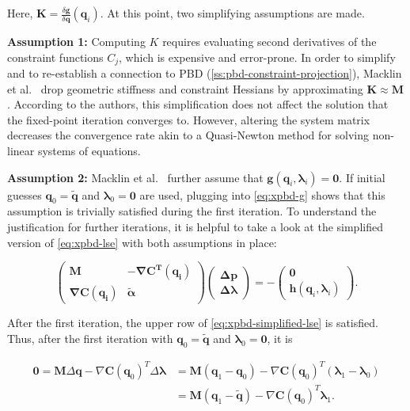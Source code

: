 \noindent Here, $\bm{K} = \frac{\delta \bm{g}}{\delta \bm{q}}(\bm{q}_i)$. At this point, two simplifying assumptions are made.

\textbf{Assumption 1:} Computing $K$ requires evaluating second derivatives of the constraint functions
$C_j$, which is expensive and error-prone. In order to simplify and to re-establish a connection to PBD (\cref{ss:pbd-constraint-projection}), 
Macklin et al.\ \cite{macklin2016} drop geometric stiffness and constraint Hessians by approximating $\bm{K} \approx \bm{M}$. 
According to the authors, this
simplification does not affect the solution that the fixed-point iteration converges to. However, altering the system matrix decreases the 
convergence rate akin to a Quasi-Newton method for solving non-linear systems of equations.

\textbf{Assumption 2:} Macklin et al.\ \cite{macklin2016} further assume that $\bm{g}(\bm{q}_i, \bm{\lambda}_i) = \bm{0}$. If initial guesses
$\bm{q}_0 = \bm{\tilde{q}}$ and $\bm{\lambda}_0 = \bm{0}$ are used, plugging into \cref{eq:xpbd-g} shows that this assumption is trivially
satisfied during the first iteration. To understand the justification for further iterations, it is helpful to take a look at the simplified
version of \cref{eq:xpbd-lse} with both assumptions in place:

\begin{equation}\label{eq:xpbd-simplified-lse}
    \begin{pmatrix}
        \bm{M} & \bm{-\nabla\bm{C}^T(\bm{q}_i)} \\
        \bm{\nabla \bm{C}(\bm{q}_i)} & \bm{\tilde{\alpha}}
    \end{pmatrix}
    \begin{pmatrix}
        \bm{\Delta \bm{p}} \\
        \bm{\Delta \bm{\lambda}}
    \end{pmatrix}
    = -
    \begin{pmatrix}
    \bm{0} \\
    \bm{h}(\bm{q}_i, \bm{\lambda}_i)
    \end{pmatrix}.
\end{equation}

\noindent After the first iteration, the upper row of \cref{eq:xpbd-simplified-lse} is satisfied. Thus, after the first iteration with 
$\bm{q}_0 = \bm{\tilde{q}}$ and $\bm{\lambda}_0 = \bm{0}$, it is

\begin{equation*}
\begin{split}
    \bm{0} = \bm{M}\Delta\bm{q} - \nabla \bm{C}(\bm{q}_0)^T \Delta \bm{\lambda} &= \bm{M}(\bm{q}_1 - \bm{q}_0) - \nabla \bm{C}(\bm{q}_0)^T 
    (\bm{\lambda}_1 - \bm{\lambda}_0) \\
    &= \bm{M}(\bm{q}_1 - \bm{\tilde{q}}) - \nabla \bm{C}(\bm{q}_0)^T \bm{\lambda}_1.
\end{split}
\end{equation*}

